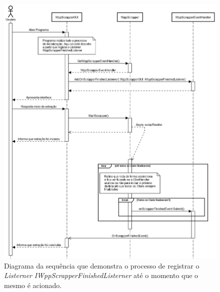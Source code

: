 
\begin{figure}[h!]
    \includegraphics[width=\textwidth]{img/UML_Sequence_EventAndStart.png}
    \caption{Diagrama da sequência que demonstra o processo de registrar o \textit{Listerner} \textit{IWppScrapperFinishedListerner} até o momento que o mesmo é acionado.}
    \centering
    \label{fig:UML_Sequence_EventAndStart}
\end{figure}

